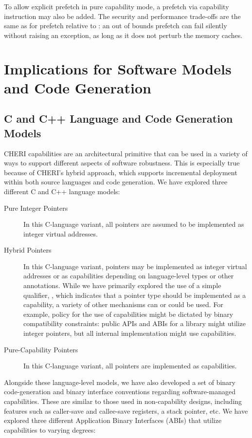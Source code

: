To allow explicit prefetch in pure capability mode, a prefetch via capability
instruction may also be added. The security and performance trade-offs are
the same as for prefetch relative to \DDC{}: an out of bounds prefetch can fail
silently without raising an exception, as long as it does not perturb the
memory caches.

\section{Implications for Software Models and Code Generation}

\subsection{C and C++ Language and Code Generation Models}

CHERI capabilities are an architectural primitive that can be used in a
variety of ways to support different aspects of software robustness.
This is especially true because of CHERI's hybrid approach, which supports
incremental deployment within both source languages and code generation.
We have explored three different C and C++ language models:

\begin{description}
\item[Pure Integer Pointers] In this C-language variant, all pointers are
  assumed to be implemented as integer virtual addresses.

\item[Hybrid Pointers] In this C-language variant, pointers may be implemented
  as integer virtual addresses or as capabilities depending on language-level
  types or other annotations.
  While we have primarily explored the use of a simple qualifier,
  , which indicates that a pointer type should be
  implemented as a capability, a variety of other mechanisms can or could be
  used.
  For example, policy for the use of capabilities might be dictated by binary
  compatibility constraints: public APIs and ABIs for a library might utilize
  integer pointers, but all internal implementation might use capabilities.

\item[Pure-Capability Pointers] In this C-language variant, all pointers are
  implemented as capabilities.
\end{description}

Alongside these language-level models, we have also developed a set of binary
code-generation and binary interface conventions regarding software-managed
capabilities.
These are similar to those used in non-capability designs, including features
such as caller-save and callee-save registers, a stack pointer, etc.
We have explored three different Application Binary Interfaces (ABIs) that
utilize capabilities to varying degrees:

